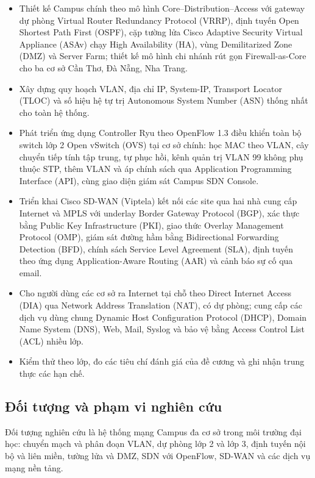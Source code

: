 \begin{itemize}
    \item Thiết kế Campus chính theo mô hình Core--Distribution--Access với gateway dự phòng Virtual Router Redundancy Protocol (VRRP), định tuyến Open Shortest Path First (OSPF), cặp tường lửa Cisco Adaptive Security Virtual Appliance (ASAv) chạy High Availability (HA), vùng Demilitarized Zone (DMZ) và Server Farm; thiết kế mô hình chi nhánh rút gọn Firewall-as-Core cho ba cơ sở Cần Thơ, Đà Nẵng, Nha Trang.
    \item Xây dựng quy hoạch VLAN, địa chỉ IP, System-IP, Transport Locator (TLOC) và số hiệu hệ tự trị Autonomous System Number (ASN) thống nhất cho toàn hệ thống.
    \item Phát triển ứng dụng Controller Ryu theo OpenFlow 1.3 điều khiển toàn bộ switch lớp 2 Open vSwitch (OVS) tại cơ sở chính: học MAC theo VLAN, cây chuyển tiếp tính tập trung, tự phục hồi, kênh quản trị VLAN 99 không phụ thuộc STP, thêm VLAN và áp chính sách qua Application Programming Interface (API), cùng giao diện giám sát Campus SDN Console.
    \item Triển khai Cisco SD-WAN (Viptela) kết nối các site qua hai nhà cung cấp Internet và MPLS với underlay Border Gateway Protocol (BGP), xác thực bằng Public Key Infrastructure (PKI), giao thức Overlay Management Protocol (OMP), giám sát đường hầm bằng Bidirectional Forwarding Detection (BFD), chính sách Service Level Agreement (SLA), định tuyến theo ứng dụng Application-Aware Routing (AAR) và cảnh báo sự cố qua email.
    \item Cho người dùng các cơ sở ra Internet tại chỗ theo Direct Internet Access (DIA) qua Network Address Translation (NAT), có dự phòng; cung cấp các dịch vụ dùng chung Dynamic Host Configuration Protocol (DHCP), Domain Name System (DNS), Web, Mail, Syslog và bảo vệ bằng Access Control List (ACL) nhiều lớp.
    \item Kiểm thử theo lớp, đo các tiêu chí đánh giá của đề cương và ghi nhận trung thực các hạn chế.
\end{itemize}

\subsection{Đối tượng và phạm vi nghiên cứu}

Đối tượng nghiên cứu là hệ thống mạng Campus đa cơ sở trong môi trường đại học: chuyển mạch và phân đoạn VLAN, dự phòng lớp 2 và lớp 3, định tuyến nội bộ và liên miền, tường lửa và DMZ, SDN với OpenFlow, SD-WAN và các dịch vụ mạng nền tảng.

